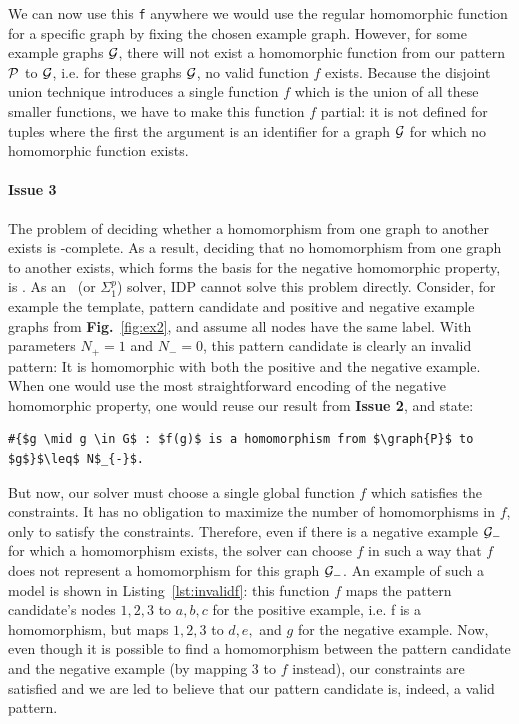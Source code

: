 We can now use this \verb|f| anywhere we would use the regular homomorphic function for a specific graph by fixing the chosen example graph.
However, for some example graphs $\mathcal{G}$, there will not exist a homomorphic function from our pattern $\mathcal{P}$ to $\mathcal{G}$, i.e. for these graphs $\mathcal{G}$, no valid function $f$ exists.
Because the disjoint union technique introduces a single function $f$ which is the union of all these smaller functions, we have to make this function $f$ partial: it is not defined for tuples where the first the argument is an identifier for a graph $\mathcal{G}$ for which no homomorphic function exists.




\paragraph{Issue 3} The problem of deciding whether a homomorphism from one graph to another exists is \NP-complete.
As a result, deciding that no homomorphism from one graph to another exists, which forms the basis for the negative homomorphic property, is \coNP.
As an \NP\ (or $\Sigma^{p}_{1}$) solver, IDP cannot solve this problem directly.
Consider, for example the template, pattern candidate and positive and negative example graphs from \textbf{Fig.}~\ref{fig:ex2}, and assume all nodes have the same label.
With parameters $N_{+}=1$ and $N_{-}=0$, this pattern candidate is clearly an invalid pattern: It is homomorphic with both the positive and the negative example.
When one would use the most straightforward encoding of the negative homomorphic property, one would reuse our result from \textbf{Issue 2}, and state:
\begin{center}
\begin{minipage}{0.61\linewidth}
\begin{lstlisting}[mathescape]
#{$g \mid g \in G$ : $f(g)$ is a homomorphism from $\graph{P}$ to $g$}$\leq$ N$_{-}$.
\end{lstlisting}
\end{minipage}
\end{center}
But now, our solver must choose a single global function $f$ which satisfies the constraints.
It has no obligation to maximize the number of homomorphisms in $f$, only to satisfy the constraints.
Therefore, even if there is a negative example $\mathcal{G}_{-}$ for which a homomorphism exists, the solver can choose $f$ in such a way that $f$ does not represent a homomorphism for this graph $\mathcal{G}_{-}$.
An example of such a model is shown in Listing~\ref{lst:invalidf}: this function $f$ maps the pattern candidate's nodes $1, 2, 3$ to $a, b, c$ for the positive example, i.e. f is a homomorphism, but maps $1, 2, 3$ to $d, e,$ and $g$ for the negative example.
Now, even though it is possible to find a homomorphism between the pattern candidate and the negative example (by mapping $3$ to $f$ instead), our constraints are satisfied and we are led to believe that our pattern candidate is, indeed, a valid pattern.

